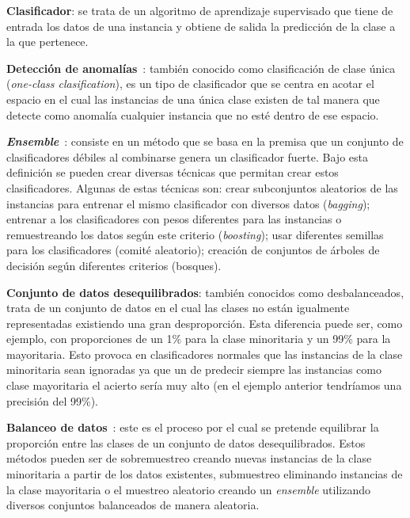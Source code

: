 \textbf{Clasificador}: se trata de un algoritmo de aprendizaje supervisado que tiene de entrada los datos de una instancia y obtiene de salida la predicción de la clase a la que pertenece.

\textbf{Detección de anomalías}~\cite{wiki:ooc}: también conocido como clasificación de clase única (\textit{one-class clasification}), es un tipo de clasificador que se centra en acotar el espacio en el cual las instancias de una única clase existen de tal manera que detecte como anomalía cualquier instancia que no esté dentro de ese espacio.

\textbf{\textit{Ensemble}}~\cite{ubu:mineria3}: consiste en un método que se basa en la premisa que un conjunto de clasificadores débiles al combinarse genera un clasificador fuerte. Bajo esta definición se pueden crear diversas técnicas que permitan crear estos clasificadores. Algunas de estas técnicas son: crear subconjuntos aleatorios de las instancias para entrenar el mismo clasificador con diversos datos (\textit{bagging}); entrenar a los clasificadores con pesos diferentes para las instancias o remuestreando los datos según este criterio (\textit{boosting}); usar diferentes semillas para los clasificadores (comité aleatorio); creación de conjuntos de árboles de decisión según diferentes criterios (bosques).

\textbf{Conjunto de datos desequilibrados}: también conocidos como desbalanceados, trata de un conjunto de datos en el cual las clases no están igualmente representadas existiendo una gran desproporción. Esta diferencia puede ser, como ejemplo, con proporciones de un 1\% para la clase minoritaria y un 99\% para la mayoritaria. Esto provoca en clasificadores normales que las instancias de la clase minoritaria sean ignoradas ya que un de predecir siempre las instancias como clase mayoritaria el acierto sería muy alto (en el ejemplo anterior tendríamos una precisión del 99\%).

\textbf{Balanceo de datos}~\cite{diez2015random, diez2015diversity, galar2012review}: este es el proceso por el cual se pretende equilibrar la proporción entre las clases de un conjunto de datos desequilibrados. Estos métodos pueden ser de sobremuestreo creando nuevas instancias de la clase minoritaria a partir de los datos existentes, submuestreo eliminando instancias de la clase mayoritaria o el muestreo aleatorio creando un \textit{ensemble} utilizando diversos conjuntos balanceados de manera aleatoria.